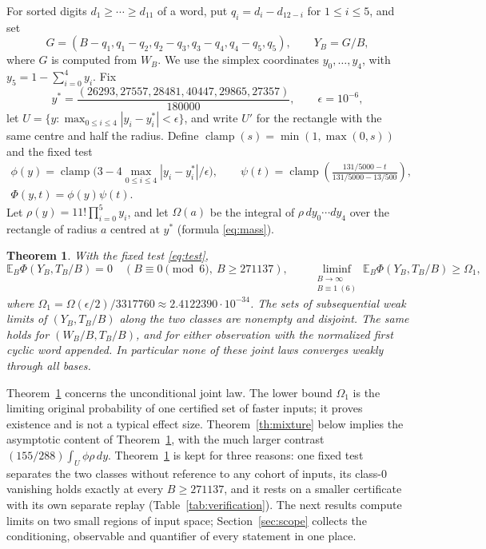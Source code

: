 \documentclass[11pt,reqno]{amsart}
\newtheorem{theorem}{Theorem}
\theoremstyle{remark}
\newcommand{\clamp}{\operatorname{clamp}}
\newcommand{\E}{\mathbb E}
\begin{document}
For sorted digits \(d_1\ge\cdots\ge d_{11}\) of a word, put \(q_i=d_i-d_{12-i}\) for \(1\le i\le5\), and set
\[
 G=(B-q_1,q_1-q_2,q_2-q_3,q_3-q_4,q_4-q_5,q_5),\qquad Y_B=G/B,
\]
where \(G\) is computed from \(W_B\). We use the simplex coordinates \(y_0,\ldots,y_4\), with \(y_5=1-\sum_{i=0}^4y_i\). Fix
\[
 y^*=\frac{(26293,27557,28481,40447,29865,27357)}{180000},
 \qquad \epsilon=10^{-6},
\]
let \(U=\{y:\max_{0\le i\le4}|y_i-y^*_i|<\epsilon\}\), and write \(U'\) for the rectangle with the same centre and half the radius. Define \(\clamp(s)=\min(1,\max(0,s))\) and the fixed test
\begin{equation}\label{eq:test}
 \begin{gathered}
 \phi(y)=\clamp\bigl(3-4\max_{0\le i\le4}|y_i-y^*_i|/\epsilon\bigr),\qquad
 \psi(t)=\clamp\!\left(\frac{131/5000-t}{131/5000-13/500}\right),\\
 \Phi(y,t)=\phi(y)\psi(t).
 \end{gathered}
\end{equation}
Let \(\rho(y)=11!\prod_{i=0}^5y_i\), and let \(\Omega(a)\) be the integral of \(\rho\,dy_0\cdots dy_4\) over the rectangle of radius \(a\) centred at \(y^*\) (formula \eqref{eq:mass}).

\begin{theorem}\label{th:separation}
With the fixed test \eqref{eq:test},
\[
 \E_B\Phi(Y_B,T_B/B)=0
 \quad(B\equiv0\!\!\pmod6,\ B\ge271137),\qquad
 \liminf_{\substack{B\to\infty\\ B\equiv1\ (6)}}\E_B\Phi(Y_B,T_B/B)\ge \Omega_1,
\]
where \(\Omega_1=\Omega(\epsilon/2)/3317760\approx2.4122390\cdot10^{-34}\). The sets of subsequential weak limits of \((Y_B,T_B/B)\) along the two classes are nonempty and disjoint. The same holds for \((W_B/B,T_B/B)\), and for either observation with the normalized first cyclic word appended. In particular none of these joint laws converges weakly through all bases.
\end{theorem}

Theorem~\ref{th:separation} concerns the unconditional joint law. The lower bound \(\Omega_1\) is the limiting original probability of one certified set of faster inputs; it proves existence and is not a typical effect size. Theorem~\ref{th:mixture} below implies the asymptotic content of Theorem~\ref{th:separation}, with the much larger contrast \((155/288)\int_U\phi\rho\,dy\). Theorem~\ref{th:separation} is kept for three reasons: one fixed test separates the two classes without reference to any cohort of inputs, its class-\(0\) vanishing holds exactly at every \(B\ge271137\), and it rests on a smaller certificate with its own separate replay (Table~\ref{tab:verification}). The next results compute limits on two small regions of input space; Section~\ref{sec:scope} collects the conditioning, observable and quantifier of every statement in one place.
\end{document}
